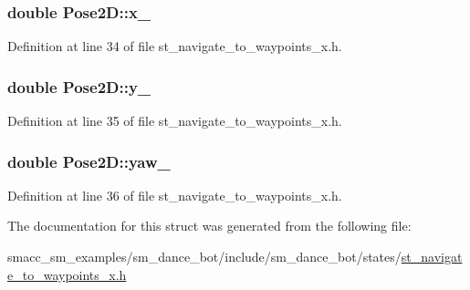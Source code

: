 \subsubsection[{\texorpdfstring{x\+\_\+}{x_}}]{\setlength{\rightskip}{0pt plus 5cm}double Pose2\+D\+::x\+\_\+}\hypertarget{structPose2D_aa2f5bc59808d11d801e6b58f57fdd3aa}{}\label{structPose2D_aa2f5bc59808d11d801e6b58f57fdd3aa}


Definition at line 34 of file st\+\_\+navigate\+\_\+to\+\_\+waypoints\+\_\+x.\+h.

\subsubsection[{\texorpdfstring{y\+\_\+}{y_}}]{\setlength{\rightskip}{0pt plus 5cm}double Pose2\+D\+::y\+\_\+}\hypertarget{structPose2D_a2c31f84b294702b4a82a2c9f44451d54}{}\label{structPose2D_a2c31f84b294702b4a82a2c9f44451d54}


Definition at line 35 of file st\+\_\+navigate\+\_\+to\+\_\+waypoints\+\_\+x.\+h.

\subsubsection[{\texorpdfstring{yaw\+\_\+}{yaw_}}]{\setlength{\rightskip}{0pt plus 5cm}double Pose2\+D\+::yaw\+\_\+}\hypertarget{structPose2D_a3f0f263a49f611369bcfb06ca9cd5a4d}{}\label{structPose2D_a3f0f263a49f611369bcfb06ca9cd5a4d}


Definition at line 36 of file st\+\_\+navigate\+\_\+to\+\_\+waypoints\+\_\+x.\+h.



The documentation for this struct was generated from the following file\+:\begin{DoxyCompactItemize}
\item 
smacc\+\_\+sm\+\_\+examples/sm\+\_\+dance\+\_\+bot/include/sm\+\_\+dance\+\_\+bot/states/\hyperlink{st__navigate__to__waypoints__x_8h}{st\+\_\+navigate\+\_\+to\+\_\+waypoints\+\_\+x.\+h}\end{DoxyCompactItemize}
